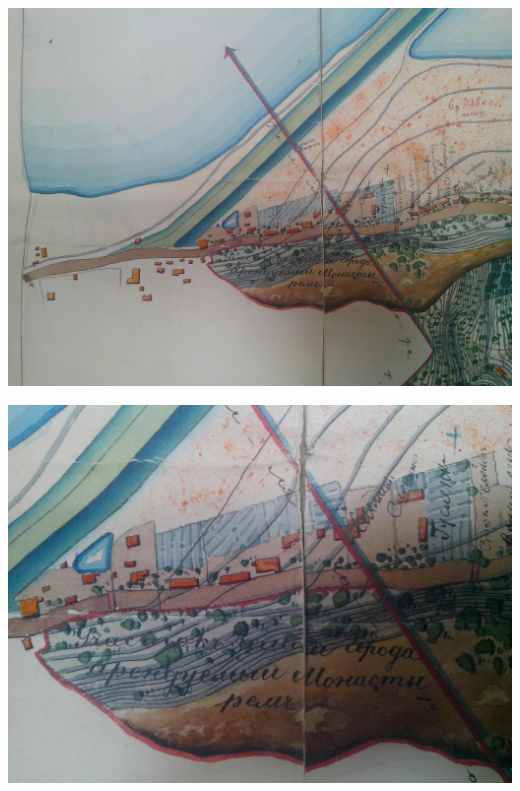 \begin{center}
\includegraphics[width=\linewidth]{chast-vosp/zver/IMG_20170627_153925.jpg}
\end{center}

\begin{center}
\includegraphics[width=\linewidth]{chast-vosp/zver/IMG_20170627_153930.jpg}
\end{center}


